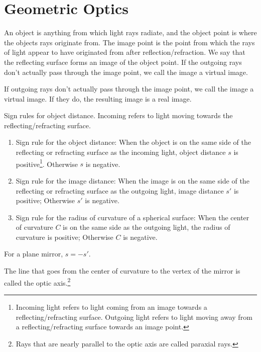 \documentclass[nobib,notoc]{tufte-handout}
\begin{document}
\section{Geometric Optics}
\begin{defi}
	An object is anything from which light rays radiate, and the object point is where the objects rays originate from. The image point is the point from which the rays of light appear to have originated from after reflection/refraction. We say that the reflecting surface forms an image of the object point. If the outgoing rays don't actually pass through the image point, we call the image a virtual image.
\end{defi}
\begin{defi}
	If outgoing rays don't actually pass through the image point, we call the image a virtual image. If they do, the resulting image is a real image.
\end{defi}
\begin{rema}
	Sign rules for object distance. Incoming refers to light moving towards the reflecting/refracting surface.
	\begin{enumerate}
		\item Sign rule for the object distance: When the object is on the same side of the reflecting or refracting surface as the incoming light, object distance \(s\) is positive\footnote{Incoming light refers to light coming from an image towards a reflecting/refracting surface. Outgoing light refers to light moving away from a reflecting/refracting surface towards an image point.}. Otherwise \(s\) is negative.
		\item Sign rule for the image distance: When the image is on the same side of the reflecting or refracting surface as the outgoing light, image distance \(s'\) is positive; Otherwise \(s'\) is negative.
		\item Sign rule for the radius of curvature of a spherical surface: When the center of curvature \(C\) is on the same side as the outgoing light, the radius of curvature is positive; Otherwise \(C\) is negative.
	\end{enumerate}
\end{rema}
\begin{rema}
	For a plane mirror, \(s=-s'\).
\end{rema}
\begin{defi}
	The line that goes from the center of curvature to the vertex of the mirror is called the optic axis.\footnote{Rays that are nearly parallel to the optic axis are called paraxial rays.}
\end{defi}
\end{document}
